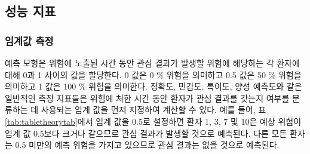 \documentclass[11pt]{book}
\theoremstyle{definition}
\theoremstyle{definition}
\theoremstyle{definition}
\theoremstyle{remark}
\begin{document}
\subsection{성능 지표}\label{performance}

\subsubsection*{임계값 측정}\label{-}

예측 모형은 위험에 노출된 시간 동안 관심 결과가 발생할 위험에 해당하는
각 환자에 대해 0과 1 사이의 값을 할당한다. 0 값은 0 \% 위험을 의미하고
0.5 값은 50 \% 위험을 의미하고 1 값은 100 \% 위험을 의미한다. 정확도,
민감도, 특이도, 양성 예측도와 같은 일반적인 측정 지표들은 위험에 처한
시간 동안 환자가 관심 결과를 갖는지 여부를 분류하는 데 사용되는 임계
값을 먼저 지정하여 계산할 수 있다. 예를 들어, 표
\ref{tab:tabletheorytab}에서 임계 값을 0.5로 설정하면 환자 1, 3, 7 및
10은 예상 위험이 임계 값 0.5보다 크거나 같으므로 관심 결과가 발생할
것으로 예측된다. 다른 모든 환자는 0.5 미만의 예측 위험을 가지고 있으므로
관심 결과는 없을 것으로 예측된다. 
  
\end{document}
